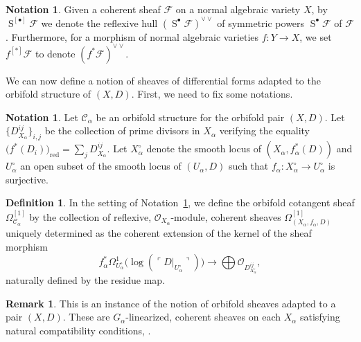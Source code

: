 \documentclass[JEP,XML,SOM,Unicode]{cedram}
\let\mathcal\mathscr
\let\scr\mathscr
\let\oldbullet\bullet
\newcommand{\sbullet}{{\scriptscriptstyle\oldbullet}}
\let\bullet\sbullet
\theoremstyle{plain}
\theoremstyle{definition}
\newtheorem{definition}[theorem]{Definition}
\newtheorem{remark}[theorem]{Remark}
\newtheorem{notation}[theorem]{Notation}
\numberwithin{equation}{theorem}
\DeclareMathOperator{\red}{red}
\DeclareMathOperator{\Sym}{S}
\newcommand{\sF}{\scr{F}}
\newcommand{\sO}{\scr{O}}
\begin{document}
\begin{notation}
Given a coherent sheaf $\sF$ on a normal algebraic variety $X$, by $\Sym ^{[\bullet]}\sF$
we denote the reflexive hull $(\Sym^{\bullet}\sF)^{\vee\vee}$ of symmetric powers
$\Sym^{\bullet}\sF$ of $\sF$. Furthermore, for a morphism of normal
algebraic varieties $f: Y \to X$, we set $f^{[*]}\sF$ to denote $(f^*\sF)^{\vee \vee}$.
\end{notation}

We can now define a notion of sheaves of differential forms adapted to the orbifold
structure of $(X,D)$. First, we need to fix some notations.

\begin{notation}\label{not:orbi}
Let $\mathcal C_{\alpha}$ be an orbifold structure for the orbifold pair $(X,D)$.
Let $\{ D_{X_{\alpha}}^{ij} \}_{i, j}$ be the collection of prime divisors in $X_{\alpha}$ verifying the
equality $\bigl(f^*(D_i)\bigr)_{\red}= \sum_j D^{ij}_{X_{\alpha}}$.
Let $X_{\alpha}^\circ$ denote the smooth locus of
$(X_{\alpha}, f_{\alpha}^*(D))$ and $U_{\alpha}^\circ$ an open subset of
the smooth locus of $(U_{\alpha}, D)$ such that $f_{\alpha}: X_{\alpha}^\circ\to U_{\alpha}^\circ$ is surjective.
\end{notation}

\begin{definition}\label{def:OrbiCot}
In the setting of Notation~\ref{not:orbi}, we define the
orbifold cotangent sheaf $\Omega_{\mathcal C_{\alpha}}^{[1]}$ by the collection
of reflexive, $\sO_{X_{\alpha}}$-module, coherent sheaves $\Omega^{[1]}_{(X_{\alpha}, f_{\alpha}, D)}$
uniquely determined as the coherent extension of the
kernel of the sheaf morphism
$$
f_{\alpha}^*\Omega^1_{U_{\alpha}^\circ} \big( \log ( \ulcorner D |_{U_{\alpha}^\circ} \urcorner) \big)
\to \bigoplus \sO_{D_{X_{\alpha}^\circ}^{ij}},
$$
naturally defined by the residue map.
\end{definition}

\begin{remark}
This is an instance of the notion of orbifold sheaves adapted to a pair $(X,D)$.
These are $G_{\alpha}$-linearized, coherent sheaves on each $X_{\alpha}$
satisfying natural compatibility conditions, \cf \cite[\S2.6]{GT16}.
\end{remark}
\end{document}
